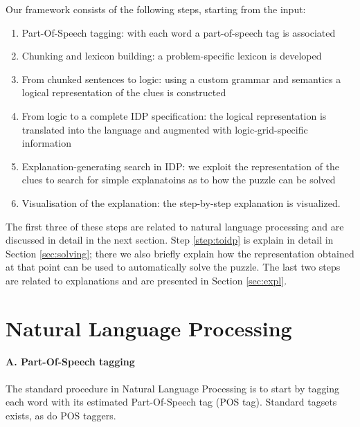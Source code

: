 Our framework consists of the following steps, starting from the input:
\begin{enumerate}[A]
\item Part-Of-Speech tagging: with each word a part-of-speech tag is associated
\item Chunking and lexicon building: a problem-specific lexicon is developed
\item From chunked sentences to logic: using a custom grammar and semantics a logical representation of the clues is constructed
 \item From logic to a complete IDP specification: the logical representation is translated into the \idp language and augmented with logic-grid-specific information \label{step:toidp}
\item Explanation-generating search in IDP: we exploit the \idp representation of the clues to search for simple explanatoins as to how the puzzle can be solved
\item Visualisation of the explanation: the step-by-step explanation is visualized.
\end{enumerate}
% 
% 

The first three of these steps are related to natural language processing and are discussed in detail in the next section. Step \ref{step:toidp} is explain in detail in Section \ref{sec:solving}; there we also briefly explain how the representation obtained at that point can be used to automatically solve the puzzle. 
The last two steps are related to explanations and are presented in Section \ref{sec:expl}. 

\section{Natural Language Processing}\label{sec:nlp}

\paragraph{A. Part-Of-Speech tagging}
The standard procedure in Natural Language Processing is to start by tagging each word with its estimated Part-Of-Speech tag (POS tag). Standard tagsets exists, as do POS taggers.

